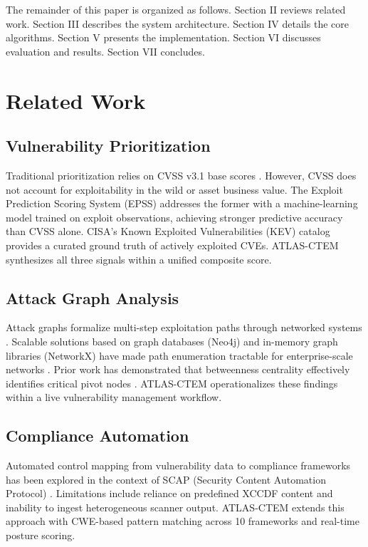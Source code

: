\documentclass[conference]{IEEEtran}
\begin{document}
The remainder of this paper is organized as follows. Section II reviews related work. Section III describes the system architecture. Section IV details the core algorithms. Section V presents the implementation. Section VI discusses evaluation and results. Section VII concludes.

\section{Related Work}

\subsection{Vulnerability Prioritization}

Traditional prioritization relies on CVSS v3.1 base scores \cite{cvss31}. However, CVSS does not account for exploitability in the wild or asset business value. The Exploit Prediction Scoring System (EPSS) \cite{epss2023} addresses the former with a machine-learning model trained on exploit observations, achieving stronger predictive accuracy than CVSS alone. CISA's Known Exploited Vulnerabilities (KEV) catalog \cite{kev2023} provides a curated ground truth of actively exploited CVEs. ATLAS-CTEM synthesizes all three signals within a unified composite score.

\subsection{Attack Graph Analysis}

Attack graphs formalize multi-step exploitation paths through networked systems \cite{jha2002}. Scalable solutions based on graph databases (Neo4j) and in-memory graph libraries (NetworkX) have made path enumeration tractable for enterprise-scale networks \cite{noel2009}. Prior work has demonstrated that betweenness centrality effectively identifies critical pivot nodes \cite{freeman1977}. ATLAS-CTEM operationalizes these findings within a live vulnerability management workflow.

\subsection{Compliance Automation}

Automated control mapping from vulnerability data to compliance frameworks has been explored in the context of SCAP (Security Content Automation Protocol) \cite{scap2011}. Limitations include reliance on predefined XCCDF content and inability to ingest heterogeneous scanner output. ATLAS-CTEM extends this approach with CWE-based pattern matching across 10 frameworks and real-time posture scoring.
\end{document}

